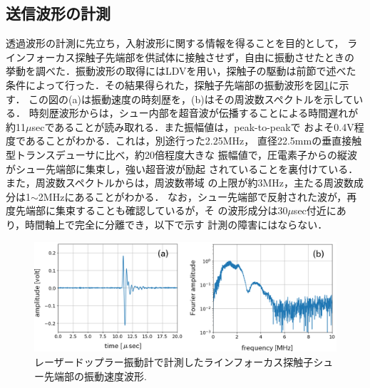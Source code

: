 \subsection{送信波形の計測}
透過波形の計測に先立ち，入射波形に関する情報を得ることを目的として，
ラインフォーカス探触子先端部を供試体に接触させず，自由に振動させたときの
挙動を調べた．振動波形の取得にはLDVを用い，探触子の駆動は前節で述べた
条件によって行った．その結果得られた，探触子先端部の振動波形を図\ref{fig:fig5}に示す．
この図の(a)は振動速度の時刻歴を，(b)はその周波数スペクトルを示している．
時刻歴波形からは，シュー内部を超音波が伝播することによる時間遅れが
約11$\mu$secであることが読み取れる．また振幅値は，peak-to-peakで
およそ0.4V程度であることがわかる．これは，別途行った2.25MHz，
直径22.5mmの垂直接触型トランスデューサに比べ，約20倍程度大きな
振幅値で，圧電素子からの縦波がシュー先端部に集束し，強い超音波が励起
されていることを裏付けている．また，周波数スペクトルからは，周波数帯域
の上限が約3MHz，主たる周波数成分は1$\sim$2MHzにあることがわかる．
なお，シュー先端部で反射された波が，再度先端部に集束することも確認しているが，そ
の波形成分は30$\mu$sec付近にあり，時間軸上で完全に分離でき，以下で示す
計測の障害にはならない．
\begin{figure}[h]
	\begin{center}
	\includegraphics[width=0.9\linewidth]{Figs/fig5.eps} 
	\end{center}
	\caption{
		レーザードップラー振動計で計測したラインフォーカス探触子シュー先端部の振動速度波形.
	} 
	\label{fig:fig5}
\end{figure}
